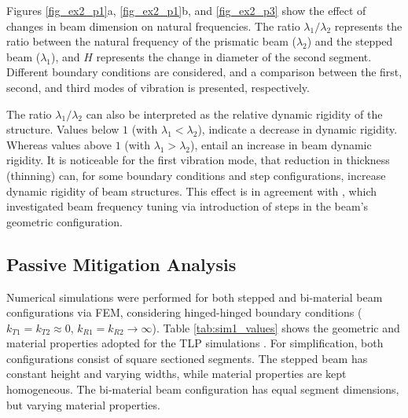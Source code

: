 
Figures \ref{fig_ex2_p1}a, \ref{fig_ex2_p1}b, and \ref{fig_ex2_p3} show the effect of changes in beam dimension on natural frequencies. The ratio $\lambda_1/\lambda_2$ represents the ratio between the natural frequency of the prismatic beam ($\lambda_2$) and the stepped beam ($\lambda_1$), and $H$ represents the change in diameter of the second segment. Different boundary conditions are considered, and a comparison between the first, second, and third modes of vibration is presented, respectively. 

The ratio $\lambda_1/\lambda_2$ can also be interpreted as the relative dynamic rigidity of the structure. Values below $1$ (with $\lambda_1<\lambda_2$), indicate a decrease in dynamic rigidity. Whereas values above $1$ (with $\lambda_1>\lambda_2$), entail an increase in beam dynamic rigidity. It is noticeable for the first vibration mode, that reduction in thickness (thinning) can, for some boundary conditions and step configurations, increase dynamic rigidity of beam structures. This effect is in agreement with \textcite{SN87}, which investigated beam frequency tuning via introduction of steps in the beam's geometric configuration. 

\subsection{Passive Mitigation Analysis}

Numerical simulations were performed for both stepped and bi-material beam configurations via FEM, considering hinged-hinged boundary conditions ($k_{T1} = k_{T2} \approx 0$, $k_{R1} = k_{R2} \rightarrow \infty$). Table \ref{tab:sim1_values} shows the geometric and material properties adopted for the TLP simulations \cite{Domagalski2021}. For simplification, both configurations consist of square sectioned segments. The stepped beam has constant height and varying widths, while material properties are kept homogeneous. The bi-material beam configuration has equal segment dimensions, but varying material properties.

